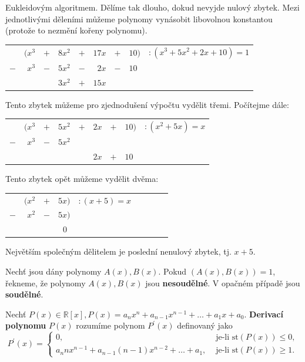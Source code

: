 \begin{reseni}
Eukleidovým algoritmem. Dělíme tak dlouho, dokud nevyjde nulový zbytek.
Mezi jednotlivými děleními můžeme polynomy vynásobit libovolnou konstantou (protože
to nezmění kořeny polynomu).
\setlength{\tabcolsep}{2pt}
\begin{center}
	\begin{tabular}{rrrrrrrrl}
	    \,  & $(x^3$ & $+$ & $8x^2$ & $+$ & $17x$ & $+$ & $10)$ & $:(x^3+5x^2+2x+10)=1$ \\
		$-$ & $x^3$  & $-$ & $5x^2$ & $-$ & $2x$  & $-$ & $10\phantom{)}$	& \, \\
		\hline
		\,  & \,     & \,  & $3x^2$ & $+$ & $15x$ & \,  & \,                & \,
	\end{tabular}
\end{center}
Tento zbytek můžeme pro zjednodušení výpočtu vydělit třemi. Počítejme dále:
\begin{center}
	\begin{tabular}{rrrrrrrrl}
	    \,  & $(x^3$ & $+$ & $5x^2$ & $+$ & $2x$ & $+$ & $10)$ & $:(x^2+5x)=x$ \\
		$-$ & $x^3$  & $-$ & $5x^2$ & \,  & \,   & \,  & \,    & \, \\
		\hline
		\,  & \,     & \,  & \,     & \,  & $2x$ & $+$ & $10\phantom{)}$ & \,
	\end{tabular}
\end{center}
Tento zbytek opět můžeme vydělit dvěma:
\begin{center}
	\begin{tabular}{rrrrrrrrl}
	    \,  & $(x^2$ & $+$ & $5x)$ & $:(x+5)=x$ \\
		$-$ & $x^2$  & $-$ & $5x)$ & \,  \\
		\hline
		\,  & \,     &   \,& $0\phantom{)}$     & \,
	\end{tabular}
\end{center}
Největším společným dělitelem je poslední nenulový zbytek, tj. $x+5$.
\end{reseni}

\begin{definition}
  Nechť jsou dány polynomy $A(x), B(x)$. Pokud $(A(x), B(x)) = 1$, řekneme, že polynomy $A(x), B(x)$ jsou \textbf{nesoudělné}. V opačném případě jsou \textbf{soudělné}.
\end{definition}

\begin{definition}
    Nechť $P(x) \in \mathbb R[x], P(x)=a_nx^n+a_{n-1}x^{n-1}+\dots+a_1x+a_0.$ \textbf{Derivací polynomu} $P(x)$ rozumíme polynom $P^\prime(x)$ definovaný jako
    $$
        P^\prime(x)=\begin{cases}
        0, &\text{ je-li st} (P(x)) \leq 0,\\
        a_n n x^{n-1} + a_{n-1}(n-1)x^{n-2} + \dots + a_1, & \text{ je-li st} (P(x)) \geq 1.
        \end{cases}
    $$
\end{definition}


